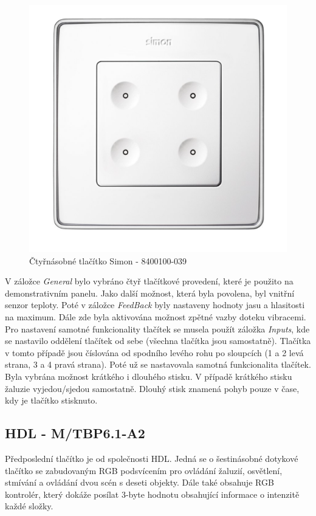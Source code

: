 \begin{figure}[!ht]
  \begin{center}
    \includegraphics[scale=0.4]{obrazky/Simon.png}
  \end{center}
  \caption[Čtyřnásobné tlačítko Simon - 8400100-039 \cite{Simon}]{Čtyřnásobné tlačítko Simon - 8400100-039 \cite{Simon}}
  \label{fig:Čtyřnásobné tlačítko Simon - 8400100-039}
\end{figure}

V záložce \textit{General} bylo vybráno čtyř tlačítkové provedení, které je použito na demonstrativním panelu. Jako další možnost, která byla povolena, byl vnitřní senzor teploty. Poté v záložce \textit{FeedBack} byly nastaveny hodnoty jasu a hlasitosti na maximum. Dále zde byla aktivována možnost zpětné vazby doteku vibracemi. Pro nastavení samotné funkcionality tlačítek se musela použít záložka \textit{Inputs}, kde se nastavilo oddělení tlačítek od sebe (všechna tlačítka jsou samostatně). Tlačítka v tomto případě jsou číslována od spodního levého rohu po sloupcích (1 a 2 levá strana, 3 a 4 pravá strana). Poté už se nastavovala samotná funkcionalita tlačítek. Byla vybrána možnost krátkého i dlouhého stisku. V případě krátkého stisku žaluzie vyjedou/sjedou samostatně. Dlouhý stisk znamená pohyb pouze v čase, kdy je tlačítko stisknuto.

\subsection{HDL - M/TBP6.1-A2}
Předposlední tlačítko je od společnosti HDL. Jedná se o šestinásobné dotykové tlačítko se zabudovaným RGB podsvícením pro ovládání žaluzií, osvětlení, stmívání a ovládání dvou scén s deseti objekty. Dále také obsahuje RGB kontrolér, který dokáže posílat 3-byte hodnotu obsahující informace o intenzitě každé složky. \cite{HDL}

